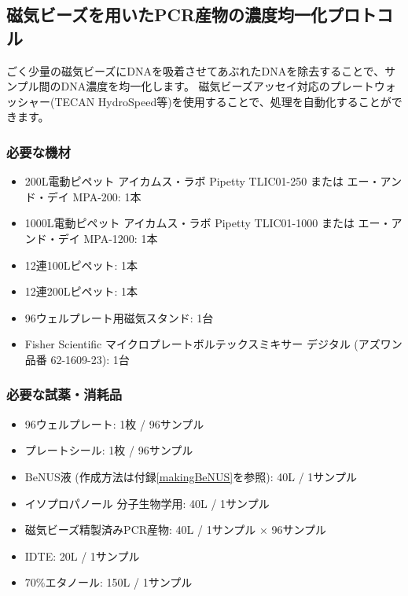 \documentclass[titlepage,10pt,a4paper]{jsbook}
\begin{document}
\subsection{磁気ビーズを用いたPCR産物の濃度均一化プロトコル}

ごく少量の磁気ビーズにDNAを吸着させてあぶれたDNAを除去することで、サンプル間のDNA濃度を均一化します。
磁気ビーズアッセイ対応のプレートウォッシャー(TECAN HydroSpeed等)を使用することで、処理を自動化することができます。

\subsubsection{必要な機材}
\begin{itemize}
\item 200{\textmu}L電動ピペット アイカムス・ラボ Pipetty TLIC01-250 または エー・アンド・デイ MPA-200: 1本
\item 1000{\textmu}L電動ピペット アイカムス・ラボ Pipetty TLIC01-1000 または エー・アンド・デイ MPA-1200: 1本
\item 12連100{\textmu}Lピペット: 1本
\item 12連200{\textmu}Lピペット: 1本
\item 96ウェルプレート用磁気スタンド: 1台
\item Fisher Scientific マイクロプレートボルテックスミキサー デジタル (アズワン品番 62-1609-23): 1台
\end{itemize}

\subsubsection{必要な試薬・消耗品}
\begin{itemize}
\item 96ウェルプレート: 1枚 / 96サンプル
\item プレートシール: 1枚 / 96サンプル
\item BeNUS液 (作成方法は付録\ref{makingBeNUS}を参照): 40{\textmu}L / 1サンプル
\item イソプロパノール 分子生物学用: 40{\textmu}L / 1サンプル
\item 磁気ビーズ精製済みPCR産物: 40{\textmu}L / 1サンプル × 96サンプル
\item IDTE: 20{\textmu}L / 1サンプル
\item 70\%エタノール: 150{\textmu}L / 1サンプル
\end{itemize}
\end{document}
